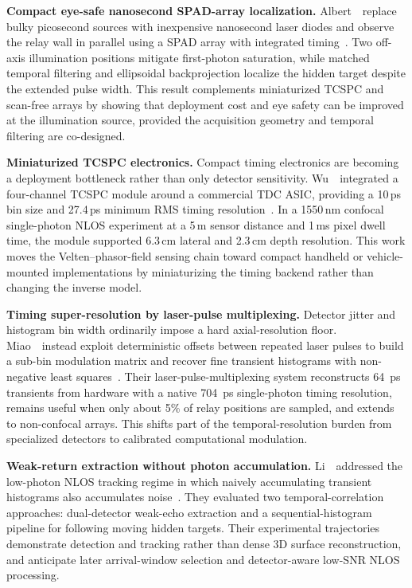 \vspace{0.8mm}
\noindent \textbf{Compact eye-safe nanosecond SPAD-array localization.}
Albert~\etal~replace bulky picosecond sources with inexpensive nanosecond laser diodes and observe the relay wall in parallel using a SPAD array with integrated timing~\cite{albertEyeSafeNLOS2026}. Two off-axis illumination positions mitigate first-photon saturation, while matched temporal filtering and ellipsoidal backprojection localize the hidden target despite the extended pulse width. This result complements miniaturized TCSPC and scan-free arrays by showing that deployment cost and eye safety can be improved at the illumination source, provided the acquisition geometry and temporal filtering are co-designed.

\vspace{0.8mm}
\noindent \textbf{Miniaturized TCSPC electronics.}
Compact timing electronics are becoming a deployment bottleneck rather than only detector sensitivity. Wu~\etal~integrated a four-channel TCSPC module around a commercial TDC ASIC, providing a 10\,ps bin size and 27.4\,ps minimum RMS timing resolution~\cite{wuMiniaturizedTCSPC2024}. In a 1550\,nm confocal single-photon NLOS experiment at a 5\,m sensor distance and 1\,ms pixel dwell time, the module supported 6.3\,cm lateral and 2.3\,cm depth resolution. This work moves the Velten--phasor-field sensing chain toward compact handheld or vehicle-mounted implementations by miniaturizing the timing backend rather than changing the inverse model.

\vspace{0.8mm}
\noindent \textbf{Timing super-resolution by laser-pulse multiplexing.}
Detector jitter and histogram bin width ordinarily impose a hard axial-resolution floor. Miao~\etal~instead exploit deterministic offsets between repeated laser pulses to build a sub-bin modulation matrix and recover fine transient histograms with non-negative least squares~\cite{miaoLaserPulseMultiplexingNLOS2026}. Their laser-pulse-multiplexing system reconstructs 64~ps transients from hardware with a native 704~ps single-photon timing resolution, remains useful when only about 5\% of relay positions are sampled, and extends to non-confocal arrays. This shifts part of the temporal-resolution burden from specialized detectors to calibrated computational modulation.

\vspace{0.8mm}
\vspace{0.8mm}
\noindent \textbf{Weak-return extraction without photon accumulation.}
Li~\etal~addressed the low-photon NLOS tracking regime in which naively accumulating transient histograms also accumulates noise~\cite{liWeakEchoesNLOS2023}. They evaluated two temporal-correlation approaches: dual-detector weak-echo extraction and a sequential-histogram pipeline for following moving hidden targets. Their experimental trajectories demonstrate detection and tracking rather than dense 3D surface reconstruction, and anticipate later arrival-window selection and detector-aware low-SNR NLOS processing.

